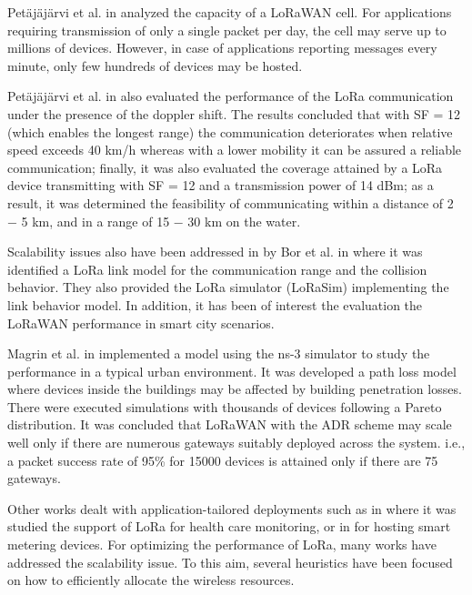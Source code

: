 Petäjäjärvi et al.
in \cite{petajajarvi_performance_2017} analyzed the capacity of a LoRaWAN cell.
For applications requiring transmission of only a single packet per day,
	the cell may serve up to millions of devices.
However,
	in case of applications reporting messages every minute,
	only few hundreds of devices may be hosted.

Petäjäjärvi et al.
in \cite{petajajarvi_performance_2017} also evaluated the performance of the LoRa communication under the presence of the doppler shift.
The results concluded that with SF = 12 (which enables the longest range) the communication deteriorates when relative speed exceeds 40 km/h whereas with a lower mobility it can be assured a reliable communication;
	finally,
	it was also evaluated the coverage attained by a LoRa device transmitting with SF = 12 and a transmission power of 14 dBm;
	as a result,
	it was determined the feasibility of communicating within a distance of 2 − 5 km,
	and in a range of 15 − 30 km on the water.

Scalability issues also have been addressed in by Bor et al.
in \cite{bor_lora_2016} where it was identified a LoRa link model for the communication range and the collision behavior.
They also provided the LoRa simulator (LoRaSim) implementing the link behavior model.
In addition,
	it has been of interest the evaluation the LoRaWAN performance in smart city scenarios.

Magrin et al.
in \cite{magrin_performance_2017} implemented a model using the ns-3 simulator to study the performance in a typical urban environment.
It was developed a path loss model where devices inside the buildings may be affected by building penetration losses.
There were executed simulations with thousands of devices following a Pareto distribution.
It was concluded that LoRaWAN with the ADR scheme may scale well only if there are numerous gateways suitably deployed across the system.
i.e.,
	a packet success rate of 95\% for 15000 devices is attained only if there are 75 gateways.

Other works dealt with application-tailored deployments such as in \cite{petajajarvi_evaluation_2017} where it was studied the support of LoRa for health care monitoring,
	or in \cite{varsier_capacity_2017} for hosting smart metering devices.
For optimizing the performance of LoRa,
	many works have addressed the scalability issue.
To this aim,
	several heuristics have been focused on how to efficiently allocate the wireless resources.

